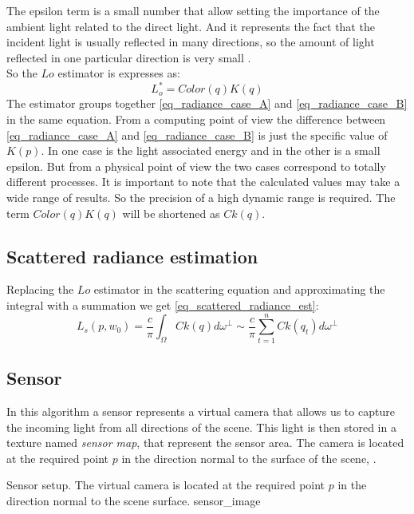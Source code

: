 \documentclass[10pt, conference]{IEEEtran}
\begin{document}
The epsilon term is a small number that allow setting the importance of the ambient light related to the direct light. 
And it represents the fact that the incident light is usually reflected in many directions, so the amount of light reflected in one particular direction is very small \cite{brdf}.\\
So the $Lo$ estimator is expresses as:
\[
	L^*_o = Color(q)K(q)
\]
The estimator groups together \ref{eq_radiance_case_A} and \ref{eq_radiance_case_B} in the same equation. 
From a computing point of view the difference between \ref{eq_radiance_case_A} and \ref{eq_radiance_case_B} is just the specific value of $K(p)$. 
In one case is the light associated energy and in the other is a small epsilon. 
But from a physical point of view the two cases correspond to totally different processes. 
It is important to note that the calculated values may take a wide range of results. 
So the precision of a high dynamic range \cite{high_dynamic_range} is required. The term $Color(q)K(q)$ will be shortened as $Ck(q)$.



\subsection{Scattered radiance estimation}

Replacing the $Lo$ estimator in the scattering equation and approximating the integral with a summation we get \ref{eq_scattered_radiance_est}:
\begin{equation}
	\label{eq_scattered_radiance_est}
	L_s(p, w_0)=\frac{c}{\pi}\int_\Omega Ck(q)d\omega^\perp \sim \frac{c}{\pi}\sum_{t=1}^n{Ck(q_t)}d\omega^\perp
\end{equation}		

\subsection{Sensor}

In this algorithm a sensor represents a virtual camera that allows us to capture the incoming light from all directions of the scene. 
This light is then stored in a texture named \emph{sensor map}, that represent the sensor area. 
The camera is located at the required point $p$ in the direction normal to the surface of the scene, .

\subimages
	{Sensor setup. The virtual camera is located at the required point $p$ in the direction normal to the scene surface.}
	{sensor_image}{
}
\end{document}
